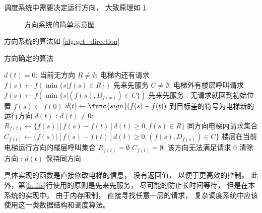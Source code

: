 \documentclass[../main.tex]{subfiles} %
\begin{document}
调度系统中需要决定运行方向，
大致原理如%
\cref{fig:direction}

\begin{figure}[H]
  \centering
  \def\svgwidth{0.6\linewidth}
  
  \caption{方向系统的简单示意图}
  \label{fig:direction}
\end{figure}

方向系统的算法如%
\cref{alg:get_direction}

\begin{algorithm}[H]
  \caption{方向确定的算法}
  \begin{codebox}
      \li \If $d(t) = 0$: \Comment 当前无方向
      \Then
        \li \If $R \neq \emptyset $: \Comment 电梯内还有请求
        \Then
          \li $f(s) \gets f\left(\min \{s|f(s) \in R\} \right)$ \Comment 先来先服务 \label{ln:fifs}
        \li \Else \If $C \neq \emptyset$: \Comment 电梯外有楼层呼叫请求
          \li $f(s) \gets
            f \left(\min \{s|(f(s),D_{f(x)}) \in C\} \right)$ \Comment 先来先服务
        \li \Else: \Comment 无请求就回到初始位置
          \li $f(s) \gets f(0)$
        \End
        \li $d(t) \gets \func{sign}(f(s)-f(t))$ \Comment 到目标差的符号为电梯新的运行方向
        \li \Return $d(t)$
      \End
      \li\Else: \Comment $d(t) \neq 0$:
      \Then
        \li $R_{f(t)} \gets \{f(s) | [f(s)-f(t)]d(t) \geq 0, f(s) \in R\}$
          \Comment 同方向电梯内请求集合
        \li $C_{f(t)} \gets \{f(s) | [f(s)-f(t)]d(t) \geq 0, (f(s),D_{f(s)}) \in C\}$
          \Comment 楼层在当前电梯运行方向的楼层呼叫集合
        \li \If $R_{f(t)} = \emptyset$  $C_{f(t)} = \emptyset$: \Comment 该方向无法满足请求
        \Then
          \li \Return $0$ \Comment 清除方向
        \li \Else:
          \li \Return $d(t)$ \Comment 保持同方向
        \End
      \End
  \end{codebox}
  \label{alg:get_direction}
\end{algorithm}
具体实现的函数是直接修改电梯的信息，
没有返回值，
以便于更高效的控制。
此外，第\ref{ln:fifs}行使用的原则是先来先服务，
尽可能的防止长时间等待，
但是在本系统的实现中，
由于内存限制，
直接寻找任意一层的请求，
复杂调度系统中应该使用这一类数据结构和调度算法。
\end{document}
